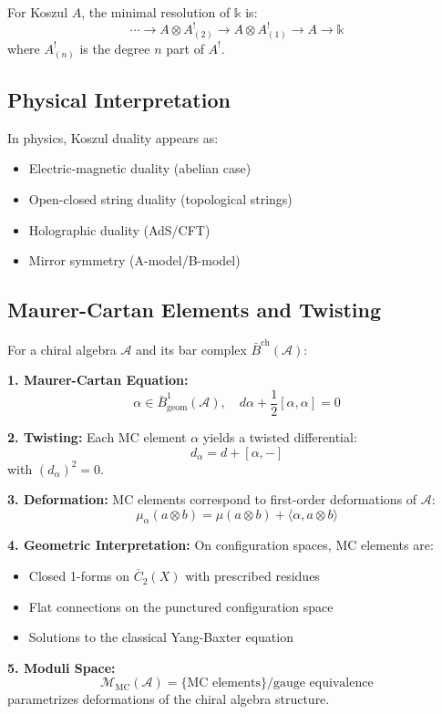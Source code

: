 \begin{lemma}
For Koszul $A$, the minimal resolution of $\mathbb{k}$ is:
$$\cdots \to A \otimes A^!_{(2)} \to A \otimes A^!_{(1)} \to A \to \mathbb{k}$$
where $A^!_{(n)}$ is the degree $n$ part of $A^!$.
\end{lemma}

\subsection{Physical Interpretation}

In physics, Koszul duality appears as:
\begin{itemize}
\item Electric-magnetic duality (abelian case)
\item Open-closed string duality (topological strings)  
\item Holographic duality (AdS/CFT)
\item Mirror symmetry (A-model/B-model)
\end{itemize}

\subsection{Maurer-Cartan Elements and Twisting}

\begin{theorem}
For a chiral algebra $\mathcal{A}$ and its bar complex $\bar{B}^{\text{ch}}(\mathcal{A})$:

\textbf{1. Maurer-Cartan Equation:}
$$\alpha \in \bar{B}^1_{\text{geom}}(\mathcal{A}), \quad d\alpha + \frac{1}{2}[\alpha, \alpha] = 0$$

\textbf{2. Twisting:}
Each MC element $\alpha$ yields a twisted differential:
$$d_{\alpha} = d + [\alpha, -]$$
with $(d_{\alpha})^2 = 0$.

\textbf{3. Deformation:}
MC elements correspond to first-order deformations of $\mathcal{A}$:
$$\mu_{\alpha}(a \otimes b) = \mu(a \otimes b) + \langle \alpha, a \otimes b \rangle$$

\textbf{4. Geometric Interpretation:}
On configuration spaces, MC elements are:
\begin{itemize}
\item Closed 1-forms on $\overline{C}_2(X)$ with prescribed residues
\item Flat connections on the punctured configuration space
\item Solutions to the classical Yang-Baxter equation
\end{itemize}

\textbf{5. Moduli Space:}
$$\mathcal{M}_{\text{MC}}(\mathcal{A}) = \{\text{MC elements}\}/\text{gauge equivalence}$$
parametrizes deformations of the chiral algebra structure.
\end{theorem}
